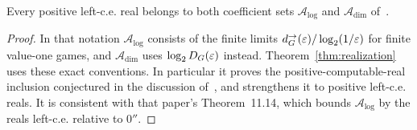 \begin{corollary}\label{cor:coefficient-inclusion}
Every positive left-c.e. real belongs to both coefficient sets $\mathcal A_{\log}$ and $\mathcal A_{\dim}$ of~\cite[Section~11.6]{DM-precision}.
\end{corollary}
\begin{proof}
In that notation $\mathcal A_{\log}$ consists of the finite limits $d^\to_G(\varepsilon)/\log_2(1/\varepsilon)$ for finite value-one games, and $\mathcal A_{\dim}$ uses $\log_2D_G(\varepsilon)$ instead. Theorem~\ref{thm:realization} uses these exact conventions. In particular it proves the positive-computable-real inclusion conjectured in the discussion of~\cite[Problem~18.3(i)]{DM-precision}, and strengthens it to positive left-c.e. reals. It is consistent with that paper's Theorem~11.14, which bounds $\mathcal A_{\log}$ by the reals left-c.e. relative to $0''$.
\end{proof}
